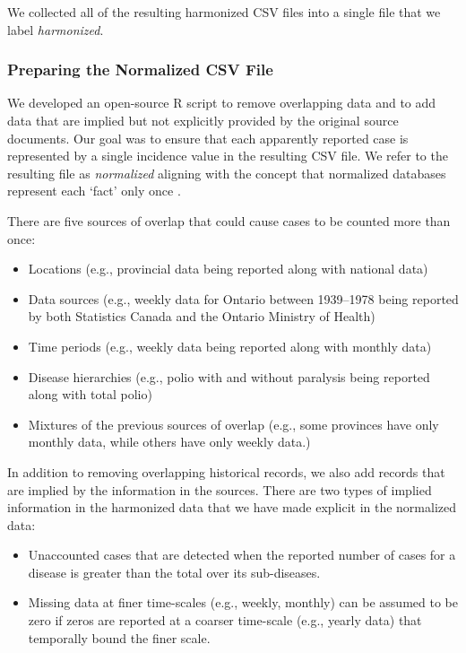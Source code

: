 \documentclass[12pt]{article}
\begin{document}
We collected all of the resulting harmonized CSV files into a single file that we label \emph{harmonized}.

\subsubsection{Preparing the Normalized CSV File}\label{sec:appendix-normalized}

We developed an open-source R script to remove overlapping data and to add data that are implied but not explicitly provided by the original source documents. Our goal was to ensure that each apparently reported case is represented by a single incidence value in the resulting CSV file. We refer to the resulting file as \emph{normalized} aligning with the concept that normalized databases represent each `fact' only once \cite{tidydata}.

There are five sources of overlap that could cause cases to be counted more than once:
\begin{itemize}
  \item Locations (e.g., provincial data being reported along with national data)
  \item Data sources (e.g., weekly data for Ontario between 1939--1978 being reported by both Statistics Canada and the Ontario Ministry of Health)
  \item Time periods (e.g., weekly data being reported along with monthly data)
  \item Disease hierarchies (e.g., polio with and without paralysis being reported along with total polio)
  \item Mixtures of the previous sources of overlap (e.g., some provinces have only monthly data, while others have only weekly data.)
\end{itemize}

In addition to removing overlapping historical records, we also add records that are implied by the information in the sources. There are two types of implied information in the harmonized data that we have made explicit in the normalized data:
\begin{itemize}
  \item Unaccounted cases that are detected when the reported number of cases for a disease is greater than the total over its sub-diseases.
  \item Missing data at finer time-scales (e.g., weekly, monthly) can be assumed to be zero if zeros are reported at a coarser time-scale (e.g., yearly data) that temporally bound the finer scale.
\end{itemize}
\end{document}
